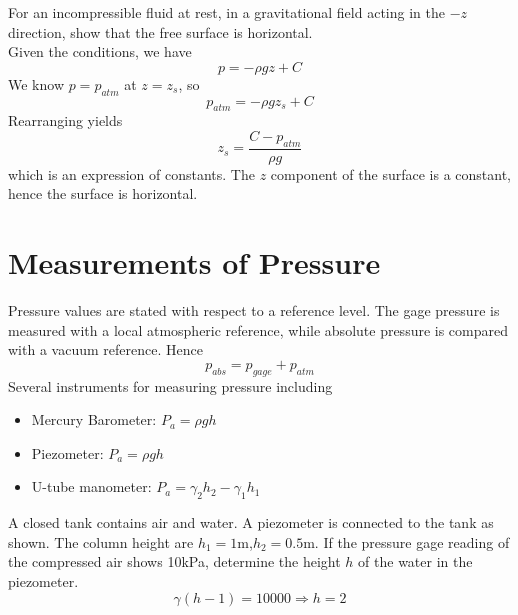 \documentclass[12pt]{article}
\begin{document}
\begin{ex}
	For an incompressible fluid at rest, in a gravitational field acting in the $-z$ direction, show that the free surface is horizontal. \\
	Given the conditions, we have
	$$p = -\rho gz + C$$
	We know $p = p_{atm}$ at $z = z_s$, so
	$$p_{atm} = -\rho gz_s+C$$
	Rearranging yields
	$$z_s = \frac{C-p_{atm}}{\rho g}$$
	which is an expression of constants. The $z$ component of the surface is a constant, hence the surface is horizontal.
\end{ex}

\section{Measurements of Pressure}
Pressure values are stated with respect to a reference level. The gage pressure is measured with a local atmospheric reference, while absolute pressure is compared with a vacuum reference. Hence
$$p_{abs} = p_{gage} + p_{atm}$$
Several instruments for measuring pressure including
\begin{itemize}
	\item Mercury Barometer: $P_a = \rho gh$
	\item Piezometer: $P_a = \rho gh$
	\item U-tube manometer: $P_a = \gamma_2h_2 - \gamma_1h_1$
\end{itemize}

\begin{ex}
	A closed tank contains air and water. A piezometer is connected to the tank as shown. The column height are $h_1=1$m,$h_2=0.5$m. If the pressure gage reading of the compressed air shows 10kPa, determine the height $h$ of the water in the piezometer. \\
	$$\gamma(h-1) = 10000 \Rightarrow h = 2$$
\end{ex}
\end{document}
